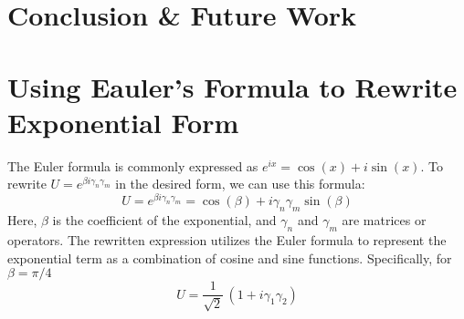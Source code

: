 \documentclass{article}
\begin{document}
\newpage
\section{Conclusion \& Future Work} %
\label{sec:Conclusion & Future Work}


\newpage



\newpage
\appendix
\section{Using Eauler's Formula to Rewrite Exponential Form} %
\label{sec:Using Eauler's Formula Rewrite Exponential Form}
The Euler formula is commonly expressed as \(e^{ix} = \cos(x) + i \sin(x)\). To rewrite \(U = e^{\beta i \gamma_n \gamma_m}\) in the desired form, we can use this formula:
\[
	U = e^{\beta i \gamma_n \gamma_m} = \cos(\beta) + i \gamma_n \gamma_m \sin(\beta)
\]
Here, \(\beta\) is the coefficient of the exponential, and \(\gamma_n\) and \(\gamma_m\) are matrices or operators. The rewritten expression utilizes the Euler formula to represent the exponential term as a combination of cosine and sine functions. Specifically, for $ \beta = \pi / 4 $
$$ U = \frac{1}{\sqrt{2}}\, (1 + i \gamma_1 \gamma_2) $$
\end{document}
